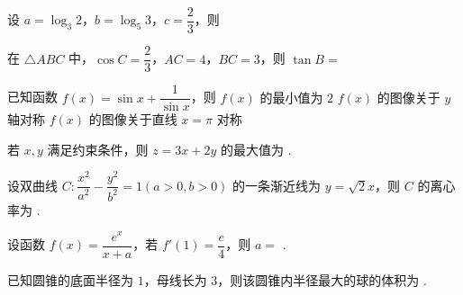 \documentclass[a4paper,11pt]{report}
\begin{document}
\begin{examquestions}
\item 设 $a=\log_3 2$，$b=\log_5 3$，$c=\dfrac23$，则

\item 在 $\triangle ABC$ 中，$\cos C=\dfrac23$，$AC=4$，$BC=3$，则 $\tan B=$

\item 已知函数 $f(x)=\sin x+\dfrac{1}{\sin x}$，则
\onechoices
{$f(x)$ 的最小值为 $2$}
{$f(x)$ 的图像关于 $y$ 轴对称}
{$f(x)$ 的图像关于直线 $x=\pi$ 对称}
{}

\end{examquestions}

\begin{examquestions}[start=13]

\item 若 $x,y$ 满足约束条件，则 $z=3x+2y$ 的最大值为 \blank.

\item 设双曲线 $C:\dfrac{x^2}{a^2}-\dfrac{y^2}{b^2}=1(a>0,b>0)$ 的一条渐近线为 $y=\sqrt2x$，则 $C$ 的离心率为 \blank.

\item 设函数 $f(x)=\dfrac{e^x}{x+a}$，若 $f'(1)=\dfrac e4$，则 $a=$ \blank.

\item 已知圆锥的底面半径为 $1$，母线长为 $3$，则该圆锥内半径最大的球的体积为 \blank.

\end{examquestions}
\end{document}
